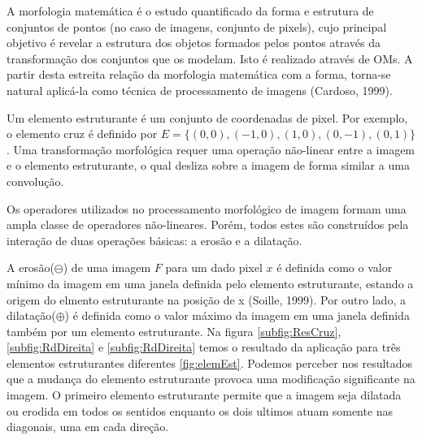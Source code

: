 \documentclass[
	article,			%
	11pt,				%
	oneside,			%
	a4paper,			%
	english,			%
	brazil,				%
	sumario=tradicional
	]{abntex2}
\begin{document}
A morfologia matemática é o estudo quantificado da forma e estrutura de
conjuntos de pontos (no caso de imagens, conjunto de pixels), cujo principal
objetivo é revelar a estrutura dos objetos formados pelos pontos através da
transformação dos conjuntos que os modelam. Isto é realizado através de OMs. A
partir desta estreita relação da morfologia matemática com a forma, torna-se
natural aplicá-la como técnica de processamento de imagens (Cardoso, 1999).

   Um elemento estruturante é um conjunto de coordenadas de pixel. Por exemplo,
o elemento cruz é definido por $E=\{(0,0),(-1,0),(1,0),(0,-1),(0,1)\}$.
Uma transformação morfológica requer uma operação não-linear entre a imagem e o
elemento estruturante, o qual desliza sobre a imagem de forma similar a uma
convolução.

Os operadores utilizados no processamento morfológico de imagem formam uma ampla
classe de operadores não-lineares. Porém, todos estes são construídos pela
interação de duas operações básicas: a erosão e a dilatação.

A erosão($\ominus$) de uma imagem $F$ para um dado pixel $x$ é definida como o
valor mínimo da imagem em uma janela definida pelo elemento estruturante, estando a origem do
elmento estruturante na posição de x (Soille, 1999). Por outro lado, a
dilatação($\oplus$) é definida como o valor máximo da imagem em uma janela
definida também por um elemento estruturante. Na figura \ref{subfig:ResCruz},\ref{subfig:RdDireita}
e \ref{subfig:RdDireita} temos o resultado da aplicação para três elementos estruturantes
diferentes \ref{fig:elemEst}. Podemos perceber nos resultados que a mudança do
elemento estruturante provoca uma modificação significante na imagem. O primeiro
elemento estruturante permite que a imagem seja dilatada ou erodida em todos os
sentidos enquanto os dois ultimos atuam somente nas diagonais, uma em cada
direção.
\end{document}
